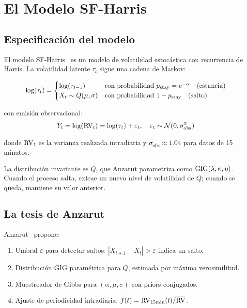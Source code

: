 
\chapter{El Modelo SF-Harris}
\label{ch:modelo-sf-harris}

\section{Especificaci\'{o}n del modelo}

El modelo SF-Harris~\citep{anzarut2024} es un modelo de volatilidad estoc\'{a}stica con
recurrencia de Harris. La volatilidad latente $\tau_t$ sigue una cadena de Markov:

\begin{equation}
    \log(\tau_t) = \begin{cases}
        \log(\tau_{t-1}) & \text{con probabilidad } p_{\text{stay}} = e^{-\alpha} \quad \text{(estancia)} \\
        X_t \sim Q(\mu, \sigma) & \text{con probabilidad } 1 - p_{\text{stay}} \quad \text{(salto)}
    \end{cases}
\end{equation}

con emisi\'{o}n observacional:
\begin{equation}
    Y_t = \log(\operatorname{RV}_t) = \log(\tau_t) + \varepsilon_t, \quad \varepsilon_t \sim \mathcal{N}(0, \sigma_{\text{obs}}^2)
\end{equation}

donde $\operatorname{RV}_t$ es la varianza realizada intradiaria y $\sigma_{\text{obs}} \approx 1.04$
para datos de 15 minutos.

La distribuci\'{o}n invariante es $Q$, que Anzarut parametriza como $\operatorname{GIG}(\lambda, \kappa, \eta)$.
Cuando el proceso salta, extrae un nuevo nivel de volatilidad de $Q$;
cuando se queda, mantiene su valor anterior.

\section{La tesis de Anzarut}

Anzarut~\citep{anzarut2024} propone:
\begin{enumerate}
    \item Umbral $\varepsilon$ para detectar saltos: $|X_{t+1} - X_t| > \varepsilon$ indica un salto.
    \item Distribuci\'{o}n GIG param\'{e}trica para $Q$, estimada por m\'{a}xima verosimilitud.
    \item Muestreador de Gibbs para $(\alpha, \mu, \sigma)$ con priors conjugados.
    \item Ajuste de periodicidad intradiaria: $f(t) = \operatorname{RV}_{\text{15min}}(t) / \overline{\operatorname{RV}}$.
\end{enumerate}


